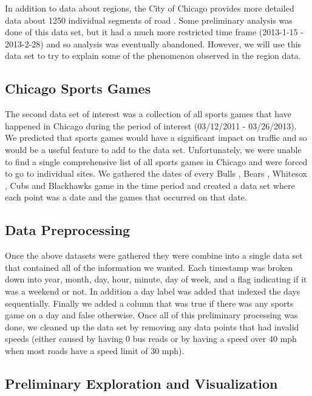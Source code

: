 \documentclass[12pt]{article}
\begin{document}
In addition to data about regions, the City of Chicago provides more detailed data about 1250 individual segments of road \cite{segmentdataset}. Some preliminary analysis was done of this data set, but it had a much more restricted time frame (2013-1-15 - 2013-2-28) and so analysis was eventually abandoned. However, we will use this data set to try to explain some of the phenomenon observed in the region data.
\subsection{Chicago Sports Games}
The second data set of interest was a collection of all sports games that have happened in Chicago during the period of interest (03/12/2011 - 03/26/2013). We predicted that sports games would have a significant impact on traffic and so would be a useful feature to add to the data set. Unfortunately, we were unable to find a single comprehensive list of all sports games in Chicago and were forced to go to individual sites. We gathered the dates of every Bulls \cite{bullsdata}, Bears \cite{bearsdata}, Whitesox \cite{whitesoxdata}, Cubs \cite{cubsdata} and Blackhawks \cite{blackhawksdata} game in the time period and created a data set where each point was a date and the games that occurred on that date.
\subsection{Data Preprocessing}
Once the above datasets were gathered they were combine into a single data set that contained all of the information we wanted. Each timestamp was broken down into year, month, day, hour, minute, day of week, and a flag indicating if it was a weekend or not. In addition a day label was added that indexed the days sequentially. Finally we added a column that was true if there was any sports game on a day and false otherwise. Once all of this preliminary processing was done, we cleaned up the data set by removing any data points that had invalid speeds (either caused by having 0 bus reads or by having a speed over 40 mph when most roads have a speed limit of 30 mph). 
\subsection{Preliminary Exploration and Visualization}
\end{document}
